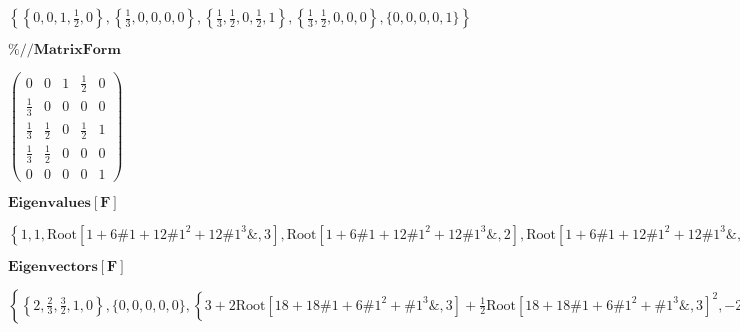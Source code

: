 \documentclass{article}
\begin{document}
\noindent\(\left\{\left\{0,0,1,\frac{1}{2},0\right\},\left\{\frac{1}{3},0,0,0,0\right\},\left\{\frac{1}{3},\frac{1}{2},0,\frac{1}{2},1\right\},\left\{\frac{1}{3},\frac{1}{2},0,0,0\right\},\{0,0,0,0,1\}\right\}\)

\noindent\(\pmb{\%\text{//}\text{MatrixForm}}\)

\noindent\(\left(
\begin{array}{ccccc}
 0 & 0 & 1 & \frac{1}{2} & 0 \\
 \frac{1}{3} & 0 & 0 & 0 & 0 \\
 \frac{1}{3} & \frac{1}{2} & 0 & \frac{1}{2} & 1 \\
 \frac{1}{3} & \frac{1}{2} & 0 & 0 & 0 \\
 0 & 0 & 0 & 0 & 1
\end{array}
\right)\)

\noindent\(\pmb{\text{Eigenvalues}[F]}\)

\noindent\(\left\{1,1,\text{Root}\left[1+6 \text{$\#$1}+12 \text{$\#$1}^2+12 \text{$\#$1}^3\&,3\right],\text{Root}\left[1+6 \text{$\#$1}+12 \text{$\#$1}^2+12
\text{$\#$1}^3\&,2\right],\text{Root}\left[1+6 \text{$\#$1}+12 \text{$\#$1}^2+12 \text{$\#$1}^3\&,1\right]\right\}\)

\noindent\(\pmb{\text{Eigenvectors}[F]}\)

\noindent\(\left\{\left\{2,\frac{2}{3},\frac{3}{2},1,0\right\},\{0,0,0,0,0\},\left\{3+2 \text{Root}\left[18+18 \text{$\#$1}+6 \text{$\#$1}^2+\text{$\#$1}^3\&,3\right]+\frac{1}{2}
\text{Root}\left[18+18 \text{$\#$1}+6 \text{$\#$1}^2+\text{$\#$1}^3\&,3\right]^2,-2-\text{Root}\left[18+18 \text{$\#$1}+6 \text{$\#$1}^2+\text{$\#$1}^3\&,3\right]-\frac{1}{3}
\text{Root}\left[18+18 \text{$\#$1}+6 \text{$\#$1}^2+\text{$\#$1}^3\&,3\right]^2,-2-\text{Root}\left[18+18 \text{$\#$1}+6 \text{$\#$1}^2+\text{$\#$1}^3\&,3\right]-\frac{1}{6}
\text{Root}\left[18+18 \text{$\#$1}+6 \text{$\#$1}^2+\text{$\#$1}^3\&,3\right]^2,1,0\right\},\left\{3+2 \text{Root}\left[18+18 \text{$\#$1}+6 \text{$\#$1}^2+\text{$\#$1}^3\&,2\right]+\frac{1}{2}
\text{Root}\left[18+18 \text{$\#$1}+6 \text{$\#$1}^2+\text{$\#$1}^3\&,2\right]^2,-2-\text{Root}\left[18+18 \text{$\#$1}+6 \text{$\#$1}^2+\text{$\#$1}^3\&,2\right]-\frac{1}{3}
\text{Root}\left[18+18 \text{$\#$1}+6 \text{$\#$1}^2+\text{$\#$1}^3\&,2\right]^2,-2-\text{Root}\left[18+18 \text{$\#$1}+6 \text{$\#$1}^2+\text{$\#$1}^3\&,2\right]-\frac{1}{6}
\text{Root}\left[18+18 \text{$\#$1}+6 \text{$\#$1}^2+\text{$\#$1}^3\&,2\right]^2,1,0\right\},\left\{3+2 \text{Root}\left[18+18 \text{$\#$1}+6 \text{$\#$1}^2+\text{$\#$1}^3\&,1\right]+\frac{1}{2}
\text{Root}\left[18+18 \text{$\#$1}+6 \text{$\#$1}^2+\text{$\#$1}^3\&,1\right]^2,-2-\text{Root}\left[18+18 \text{$\#$1}+6 \text{$\#$1}^2+\text{$\#$1}^3\&,1\right]-\frac{1}{3}
\text{Root}\left[18+18 \text{$\#$1}+6 \text{$\#$1}^2+\text{$\#$1}^3\&,1\right]^2,-2-\text{Root}\left[18+18 \text{$\#$1}+6 \text{$\#$1}^2+\text{$\#$1}^3\&,1\right]-\frac{1}{6}
\text{Root}\left[18+18 \text{$\#$1}+6 \text{$\#$1}^2+\text{$\#$1}^3\&,1\right]^2,1,0\right\}\right\}\)
\end{document}
